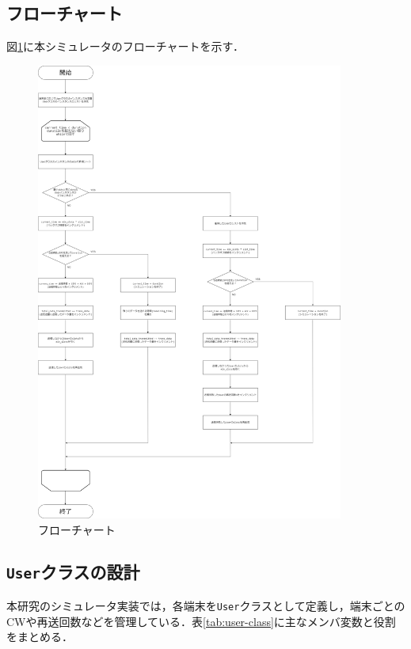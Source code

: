 \documentclass[a4paper,10pt]{ltjsarticle}
\begin{document}
\clearpage
\subsection{フローチャート}
図\ref{flowchart}に本シミュレータのフローチャートを示す．


\begin{figure}[H]
  \centering
  \includegraphics[width=0.9\textwidth]{./assets/flowchart.drawio.png}
  \caption{フローチャート}
  \label{flowchart}
\end{figure}



\subsection{\texttt{User}クラスの設計}
本研究のシミュレータ実装では，各端末を\texttt{User}クラスとして定義し，端末ごとのCWや再送回数などを管理している．表\ref{tab:user-class}に主なメンバ変数と役割をまとめる．
\end{document}
